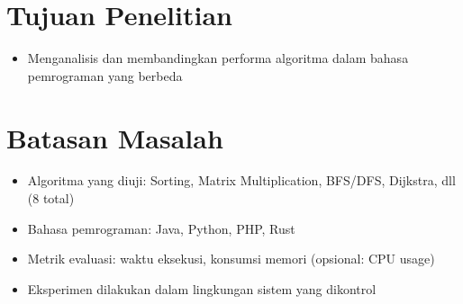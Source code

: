 
\section{Tujuan Penelitian}
\label{sec:tujuanPenelitian}

\begin{itemize}
	\item Menganalisis dan membandingkan performa algoritma dalam bahasa pemrograman yang berbeda
\end{itemize}

\section{Batasan Masalah}
\label{sec:batasanMasalah}

\begin{itemize}
	\item Algoritma yang diuji: Sorting, Matrix Multiplication, BFS/DFS, Dijkstra, dll (8 total)
	\item Bahasa pemrograman: Java, Python, PHP, Rust
	\item Metrik evaluasi: waktu eksekusi, konsumsi memori (opsional: CPU usage)
	\item Eksperimen dilakukan dalam lingkungan sistem yang dikontrol
\end{itemize}


